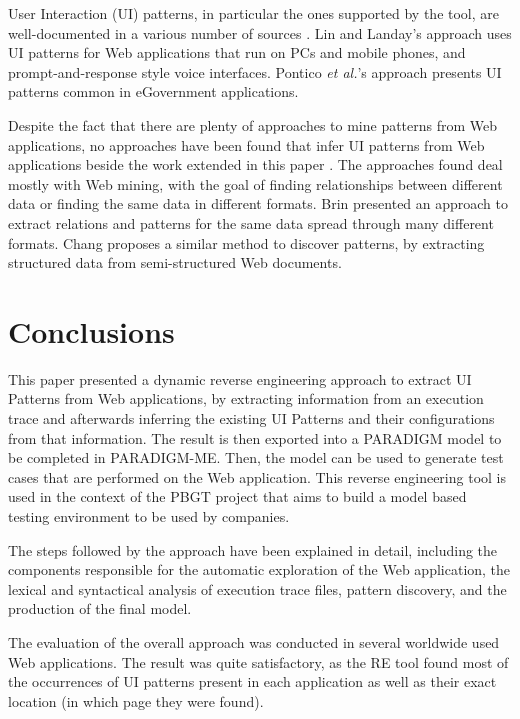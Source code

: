 \documentclass[conference]{IEEEtran}
\begin{document}
User Interaction (UI) patterns, in particular the ones supported by the tool, are well-documented in a various number of sources \cite{tidwell2010designing, van2001patterns, neil12standard,sinnig2005patterns}. Lin and Landay's approach \cite{lin2008employing} uses UI patterns for Web applications that run on PCs and mobile phones, and prompt-and-response style voice interfaces. Pontico \textit{et al.}'s approach \cite{pontico2008organizing} presents UI patterns common in eGovernment applications.

Despite the fact that there are plenty of approaches to mine patterns from Web applications, no approaches have been found that infer UI patterns from Web applications beside the work extended in this paper \cite{nabuco2013inferring, morgado2012gui}. The approaches found deal mostly with Web mining, with the goal of finding relationships between different data or finding the same data in different formats. Brin \cite{brin1999extracting} presented an approach to extract relations and patterns for the same data spread through many different formats. Chang \cite{chang2003automatic} proposes a similar method to discover patterns, by extracting structured data from semi-structured Web documents.

\section{Conclusions}\label{sec:conc}

This paper presented a dynamic reverse engineering approach to extract UI Patterns from Web applications, by extracting information from an execution trace and afterwards inferring the existing UI Patterns and their configurations from that information. The result is then exported into a PARADIGM model to be completed in PARADIGM-ME. Then, the model can be used to generate test cases that are performed on the Web application. This reverse engineering tool is used in the context of the PBGT project that aims to build a model based testing environment to be used by companies. 

The steps followed by the approach have been explained in detail,  including the components responsible for the automatic exploration of the Web application, the lexical and syntactical analysis of execution trace files, pattern discovery, and the production of the final model.

The evaluation of the overall approach was conducted in several worldwide used Web applications. The result was quite satisfactory, as the RE tool found most of the occurrences of UI patterns present in each application as well as their exact location (in which page they were found).
\end{document}
